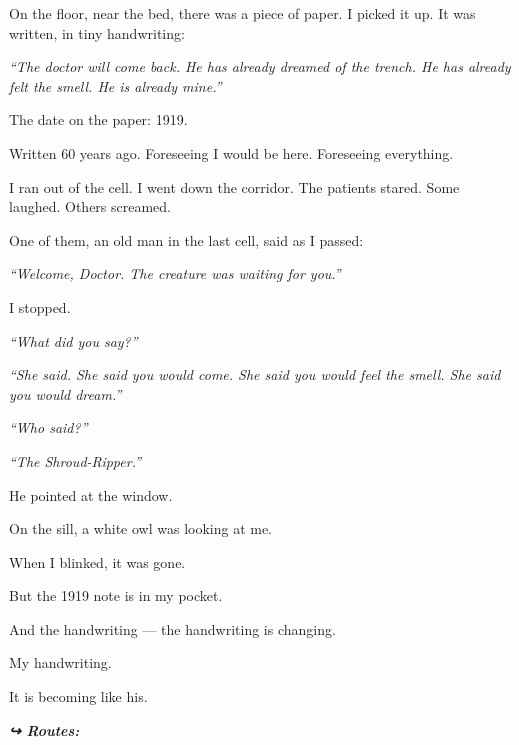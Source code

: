 \noindent On the floor, near the bed, there was a piece of paper. I picked it up. It was written, in tiny handwriting:

\noindent \textit{\textquotedblleft{}The doctor will come back. He has already dreamed of the trench. He has already felt the smell. He is already mine.\textquotedblright{}}

\noindent The date on the paper: 1919.

\noindent Written 60 years ago.
Foreseeing I would be here.
Foreseeing everything.

\noindent I ran out of the cell. I went down the corridor. The patients stared. Some laughed. Others screamed.

\noindent One of them, an old man in the last cell, said as I passed:

\noindent \textit{\textquotedblleft{}Welcome, Doctor. The creature was waiting for you.\textquotedblright{}}

\noindent I stopped.

\noindent \textit{\textquotedblleft{}What did you say?\textquotedblright{}}

\noindent \textit{\textquotedblleft{}She said. She said you would come. She said you would feel the smell. She said you would dream.\textquotedblright{}}

\noindent \textit{\textquotedblleft{}Who said?\textquotedblright{}}

\noindent \textit{\textquotedblleft{}The Shroud-Ripper.\textquotedblright{}}

\noindent He pointed at the window.

\noindent On the sill, a white owl was looking at me.

\noindent When I blinked, it was gone.

\noindent But the 1919 note is in my pocket.

\noindent And the handwriting --- the handwriting is changing.

\noindent My handwriting.

\noindent It is becoming like his.

\vspace{0.5em}
\noindent\textit{\textbf{↪ Routes:}  \rotasep {} \rotasep {}}
